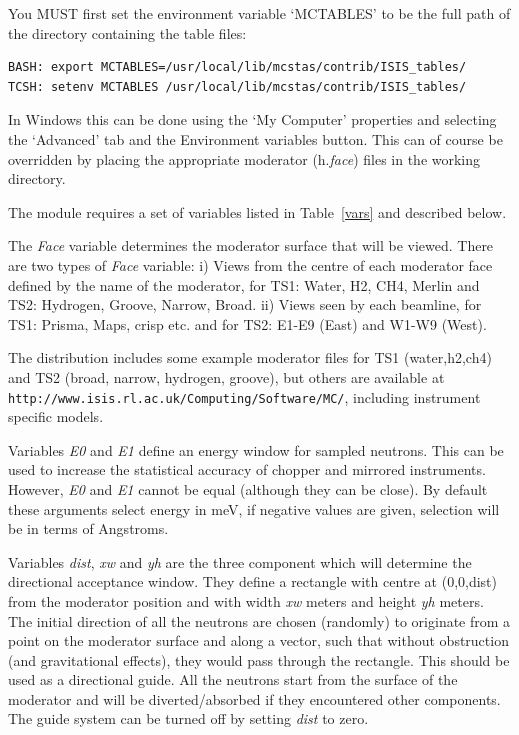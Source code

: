 You MUST first set the environment variable `MCTABLES' to be the
full path of the directory containing the table files:
\begin{lstlisting}
BASH: export MCTABLES=/usr/local/lib/mcstas/contrib/ISIS_tables/
TCSH: setenv MCTABLES /usr/local/lib/mcstas/contrib/ISIS_tables/
\end{lstlisting}
In Windows this can be done using the `My Computer' properties and
selecting the `Advanced' tab and the Environment variables button.
This can of course be overridden by placing the appropriate moderator (h.\textit{{face}}) files in the
working directory.

The module requires a set of variables
listed in Table~\ref{vars} and described below.

The \textit{Face} variable determines the moderator surface that will
be viewed. There are two types of \textit{Face} variable: i)  Views
from the centre of each moderator face defined by the name of the
moderator, for TS1: Water, H2, CH4, Merlin and TS2: Hydrogen,
Groove, Narrow, Broad. ii) Views seen by each beamline, for TS1:
Prisma, Maps, crisp etc. and for TS2: E1-E9 (East) and W1-W9
(West).

The \MCS distribution includes some example moderator files for TS1 (water,h2,ch4) and TS2 (broad, narrow, hydrogen, groove), but others are available at \\ \verb+http://www.isis.rl.ac.uk/Computing/Software/MC/+, including instrument specific models.



Variables \textit{E0} and \textit{E1} define an energy window for sampled neutrons.
This can be used to increase the statistical
accuracy of chopper and mirrored instruments. However, \textit{E0} and
\textit{E1} cannot be equal (although they can be close). By default these arguments
select energy in meV, if negative values are given, selection will be in terms of Angstroms.

Variables \textit{dist}, \textit{xw} and \textit{yh} are the three
component which will determine the directional acceptance window.
They define a rectangle with centre at (0,0,dist) from the
moderator position and with width \textit{xw} meters and height \textit{yh} meters.
The initial direction of all the neutrons are chosen (randomly) to
originate from a point on the moderator surface and along a
vector, such that without obstruction (and gravitational effects),
they would pass through the rectangle. This should be used as a
directional guide. All the neutrons start from the surface of the
moderator and will be diverted/absorbed if they encountered other
components. The guide system can be turned off by setting \textit{
dist} to zero.

